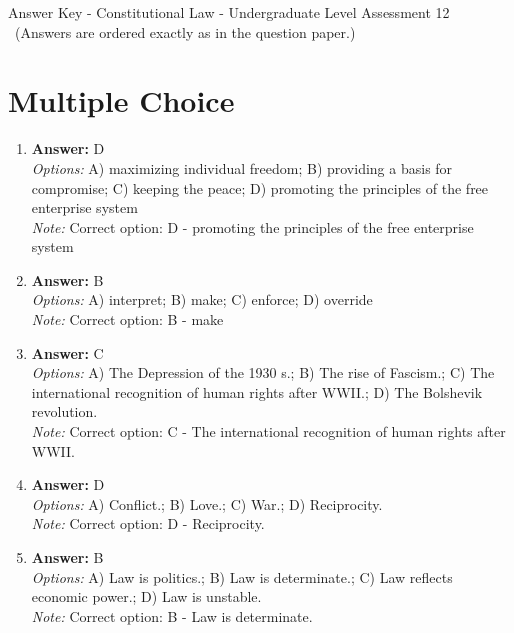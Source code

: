 \documentclass[12pt]{article}
\begin{document}
\begin{center}
Answer Key - Constitutional Law - Undergraduate Level Assessment 12 \
\small (Answers are ordered exactly as in the question paper.)
\end{center}

\section*{Multiple Choice}
\begin{enumerate}[label=\arabic*.]
\item \textbf{Answer:} D
\\ \textit{Options:} A) maximizing individual freedom; B) providing a basis for compromise; C) keeping the peace; D) promoting the principles of the free enterprise system
\\ \textit{Note:} Correct option: D - promoting the principles of the free enterprise system
\item \textbf{Answer:} B
\\ \textit{Options:} A) interpret; B) make; C) enforce; D) override
\\ \textit{Note:} Correct option: B - make
\item \textbf{Answer:} C
\\ \textit{Options:} A) The Depression of the 1930 s.; B) The rise of Fascism.; C) The international recognition of human rights after WWII.; D) The Bolshevik revolution.
\\ \textit{Note:} Correct option: C - The international recognition of human rights after WWII.
\item \textbf{Answer:} D
\\ \textit{Options:} A) Conflict.; B) Love.; C) War.; D) Reciprocity.
\\ \textit{Note:} Correct option: D - Reciprocity.
\item \textbf{Answer:} B
\\ \textit{Options:} A) Law is politics.; B) Law is determinate.; C) Law reflects economic power.; D) Law is unstable.
\\ \textit{Note:} Correct option: B - Law is determinate.
\end{enumerate}
\end{document}
